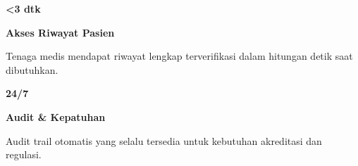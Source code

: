 \documentclass[a4paper]{article}
\begin{document}
\begin{minipage}[t]{0.485\textwidth}
    \noindent\colorbox{BlueBg}{%
        \begin{minipage}[t][2.7cm][c]{\dimexpr\linewidth-2\fboxsep\relax}
            \centering
            {\fontsize{20}{24}\selectfont\bfseries\color{BluePrimary} <3 dtk}\par\vspace{2pt}
            {\fontsize{9.5}{12}\selectfont\bfseries\color{BlueDark} Akses Riwayat Pasien}\par\vspace{2pt}
            {\fontsize{8.5}{11}\selectfont\color{TextDark}Tenaga medis mendapat riwayat lengkap terverifikasi dalam hitungan detik saat dibutuhkan.}
        \end{minipage}}\par
    \vspace{6pt}
    \noindent\colorbox{BlueBg}{%
        \begin{minipage}[t][2.7cm][c]{\dimexpr\linewidth-2\fboxsep\relax}
            \centering
            {\fontsize{20}{24}\selectfont\bfseries\color{BluePrimary} 24/7}\par\vspace{2pt}
            {\fontsize{9.5}{12}\selectfont\bfseries\color{BlueDark} Audit \& Kepatuhan}\par\vspace{2pt}
            {\fontsize{8.5}{11}\selectfont\color{TextDark}Audit trail otomatis yang selalu tersedia untuk kebutuhan akreditasi dan regulasi.}
        \end{minipage}}%
\end{minipage}

\vspace{8pt}
\end{document}
